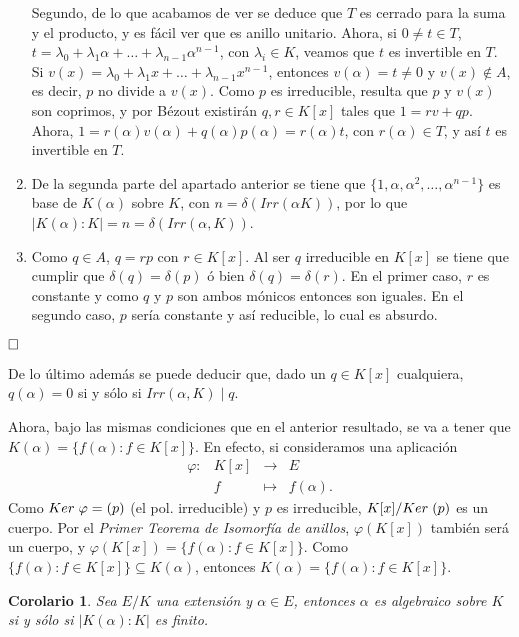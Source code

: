 \documentclass[12pt]{article}
\newtheorem{corolario}{Corolario}[theorem]
\begin{document}
\begin{enumerate}
Segundo, de lo que acabamos de ver se deduce que $T$ es cerrado para la suma y el producto, y es fácil ver que es anillo unitario. Ahora, si $0 \neq t \in T$, $t = \lambda_{0} + \lambda_{1} \alpha + \ldots + \lambda_{n-1} \alpha^{n-1}$, con $\lambda_{i} \in K$, veamos que $t$ es invertible en $T$. Si $v(x) = \lambda_{0} + \lambda_{1} x + \ldots + \lambda_{n-1} x^{n-1}$, entonces $v(\alpha) = t \neq 0$ y $v(x) \notin A$, es decir, $p$ no divide a $v(x)$. Como $p$ es irreducible, resulta que $p$ y $v(x)$ son coprimos, y por Bézout existirán $q,r \in K[x]$ tales que $1 = rv + qp$. Ahora, $1 = r(\alpha)v(\alpha) + q(\alpha) p(\alpha) = r(\alpha) t$, con $r(\alpha) \in T$, y así $t$ es invertible en $T$.
\item De la segunda parte del apartado anterior se tiene que $\lbrace 1, \alpha, \alpha^{2}, \ldots, \alpha^{n-1} \rbrace$ es base de $K(\alpha)$ sobre $K$, con $n = \delta (Irr(\alpha K))$, por lo que $|K(\alpha) : K| = n = \delta (Irr(\alpha, K))$. 
\item Como $q \in A$, $q = rp$ con $r \in K[x]$. Al ser $q$ irreducible en $K[x]$ se tiene que cumplir que $\delta (q) = \delta (p)$ ó bien $\delta (q) = \delta (r)$. En el primer caso, $r$ es constante y como $q$ y $p$ son ambos mónicos entonces son iguales. En el segundo caso, $p$ sería constante y así reducible, lo cual es absurdo.
\end{enumerate}

$\hfill \square$

De lo último además se puede deducir que, dado un $q \in K[x]$ cualquiera, $q(\alpha) = 0$ si y sólo si $Irr(\alpha, K) \mid q.$


Ahora, bajo las mismas condiciones que en el anterior resultado, se va a tener que $K(\alpha) = \lbrace f(\alpha) : f \in K[x] \rbrace$. En efecto, si consideramos una aplicación $$\begin{array}{rccl}
\varphi \colon &K[x]&\longrightarrow &E \\
&f& \longmapsto &f(\alpha).
\end{array}
$$ Como $Ker \hspace{0.1cm} \varphi = (p)$ (el pol. irreducible) y $p$ es irreducible, $K[x]/Ker \hspace{0.1cm} (p)$ es un cuerpo. Por el \textit{Primer Teorema de Isomorfía de anillos}, $\varphi (K[x])$ también será un cuerpo, y $\varphi(K[x]) = \lbrace f(\alpha) :f \in K[x] \rbrace.$ Como $\lbrace f(\alpha) : f \in K[x] \rbrace \subseteq K(\alpha)$, entonces $K(\alpha) = \lbrace f(\alpha) : f \in K[x] \rbrace$.
\begin{corolario}\label{eq:cor1} Sea $E/K$ una extensión y $\alpha \in E$, entonces $\alpha$ es algebraico sobre $K$ si y sólo si $|K(\alpha) : K|$ es finito.
\end{corolario}
\end{document}
